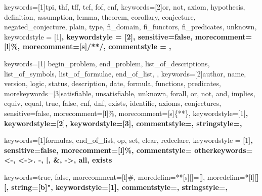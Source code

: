 


{
  keywords=[1]{tpi, thf, tff, tcf, fof, cnf},
  keywords=[2]{or, not, axiom, hypothesis, definition, assumption, lemma, theorem, corollary, conjecture, negated_conjecture, plain, type, fi_domain, fi_functors, fi_predicates, unknown},
  keywordstyle = [1]\color{bluegreen}\bfseries,
  keywordstyle = [2]\color{purple}\bfseries,
  sensitive=false, %
  morecomment=[l]{\%}, %
  morecomment=[s]{/*}{*/}, %
  commentstyle = \color{gray},
}

{
  keywords=[1]{
    begin\_problem,
    end\_problem,
    list\_of\_descriptions,
    list\_of\_symbols,
    list\_of\_formulae,
    end\_of\_list,
  },
  keywords=[2]{author, name, version, logic, status, description, date, formula, functions, predicates},
  morekeywords=[3]{satisfiable, unsatisfiable, unknown, forall, or, not, and, implies, equiv, equal, true, false, cnf, dnf, exists, identifie, axioms, conjectures},
  sensitive=false, %
  morecomment=[l]{\%}, %
  morecomment=[s]{\{*}{*\}}, %
  keywordstyle=[1]\color{bluegreen}\bfseries,
  keywordstyle=[2]\color{lightblue}\bfseries,
  keywordstyle=[3]\color{purple}\bfseries,
  commentstyle=\color{gray},
  stringstyle=\color{orange},
}

{
  keywords=[1]{formulas, end\_of\_list, op, set, clear, redeclare},
  keywordstyle = [1]\color{bluegreen}\bfseries,
  sensitive=false, %
  morecomment=[l]{\%}, %
  commentstyle=\color{gray}
  otherkeywords={<-, <->. -, |, &, ->, all, exists}
}

{
  keywords={true, false},
  morecomment=[l]{\#}, %
  moredelim=**[s][]{=[}{]}, %
  moredelim=*[l][\color{bluegreen}\bfseries]{[}, %
  string=[b]",
  keywordstyle=[1]\color{purple}\bfseries,
  commentstyle=\color{gray},
  stringstyle=\color{green}\bfseries,
}

